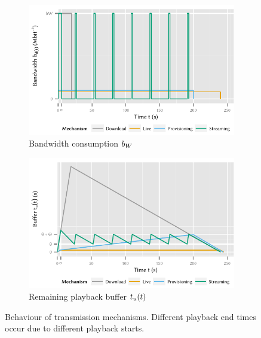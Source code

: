 \begin{figure}
	\begin{subfigure}[b]{\textwidth}
	\centering
	\includegraphics{application/lte_video/system_model/figures/video_model_bandwidth}
	\caption{Bandwidth consumption \(b_W\)}\label{fig:application:lte_video:system_model:video_model:bandwidth}
	\end{subfigure} 
	\begin{subfigure}[b]{\textwidth}
	\centering
	\includegraphics{application/lte_video/system_model/figures/video_model_playback}
	\caption{Remaining playback buffer \(t_u(t)\)}\label{fig:application:lte_video:system_model:video_model:playback}
	\end{subfigure}

	\caption{Behaviour of transmission mechanisms. Different playback end times occur due to different playback starts.}\label{fig:application:lte_video:system_model:video_model}
\end{figure}

